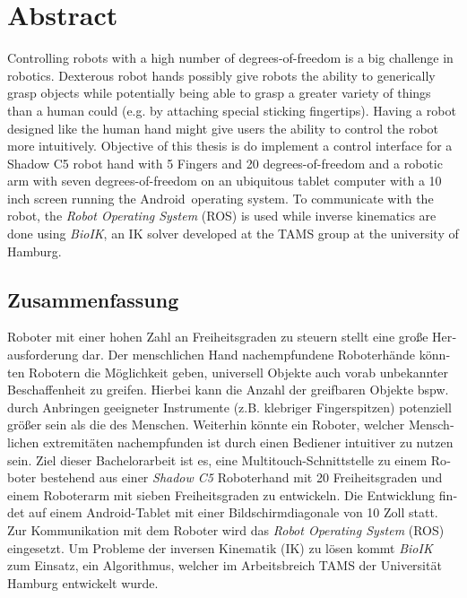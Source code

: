 \chapter{Abstract}

Controlling robots with a high number of degrees-of-freedom is a big challenge in robotics. Dexterous robot hands possibly give robots the ability to generically grasp objects while potentially being able to grasp a greater variety of things than a human could (e.g. by attaching special sticking fingertips). Having a robot designed like the human hand might give users the ability to control the robot more intuitively. Objective of this thesis is do implement a control interface for a Shadow C5 robot hand with 5 Fingers and 20 degrees-of-freedom and a robotic arm with seven degrees-of-freedom on an ubiquitous tablet computer with a 10 inch screen running the Android\textregistered~operating system. To communicate with the robot, the \textit{Robot Operating System} (ROS) is used while inverse kinematics are done using \textit{BioIK}\cite{Ruppel17}, an IK solver developed at the TAMS group at the university of Hamburg.

\begin{otherlanguage}{ngerman}
{\let\clearpage\relax\chapter*{Zusammenfassung}}

Roboter mit einer hohen Zahl an Freiheitsgraden zu steuern stellt eine große Herausforderung dar. Der menschlichen Hand nachempfundene Roboterhände könnten Robotern die Möglichkeit geben, universell Objekte auch vorab unbekannter Beschaffenheit zu greifen. Hierbei kann die Anzahl der greifbaren Objekte bspw. durch Anbringen geeigneter Instrumente (z.B. klebriger Fingerspitzen) potenziell größer sein als die des Menschen. Weiterhin könnte ein Roboter, welcher Menschlichen extremitäten nachempfunden ist durch einen Bediener intuitiver zu nutzen sein. Ziel dieser Bachelorarbeit ist es, eine Multitouch-Schnittstelle zu einem Roboter bestehend aus einer \textit{Shadow C5} Roboterhand mit 20 Freiheitsgraden und einem Roboterarm mit sieben Freiheitsgraden zu entwickeln. Die Entwicklung findet auf einem Android\textregistered-Tablet mit einer Bildschirmdiagonale von 10 Zoll statt. Zur Kommunikation mit dem Roboter wird das \textit{Robot Operating System} (ROS) eingesetzt. Um Probleme der inversen Kinematik (IK) zu lösen kommt \textit{BioIK}\cite{Ruppel17} zum Einsatz, ein Algorithmus, welcher im Arbeitsbreich TAMS der Universität Hamburg entwickelt wurde.

\end{otherlanguage}


